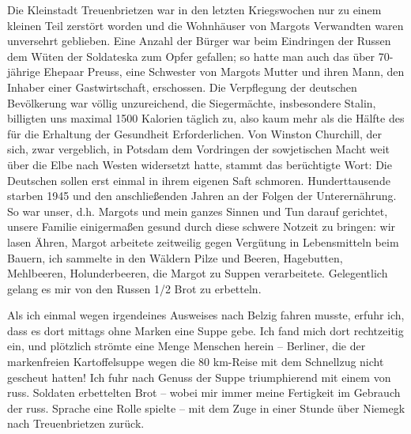  Die Kleinstadt Treuenbrietzen war in den letzten Kriegswochen nur zu einem kleinen Teil zerstört worden und die Wohnhäuser von Margots Verwandten waren unversehrt geblieben. Eine Anzahl der Bürger war beim Eindringen der Russen dem Wüten der Soldateska zum Opfer gefallen; so hatte man auch das über 70-jährige Ehepaar Preuss, eine Schwester von Margots Mutter und ihren Mann, den Inhaber einer Gastwirtschaft, erschossen. Die Verpflegung der deutschen Bevölkerung war völlig unzureichend, die Siegermächte, insbesondere Stalin, billigten uns maximal 1500 Kalorien täglich zu, also kaum mehr als die Hälfte des für die Erhaltung der Gesundheit Erforderlichen. Von Winston Churchill, der sich, zwar vergeblich, in Potsdam dem Vordringen der sowjetischen Macht weit über die Elbe nach Westen widersetzt hatte, stammt das berüchtigte Wort: Die Deutschen sollen erst einmal in ihrem eigenen Saft schmoren. Hunderttausende starben 1945 und den anschließenden Jahren an der Folgen der Unterernährung. So war unser, d.h. Margots und mein ganzes Sinnen und Tun darauf gerichtet, unsere Familie einigermaßen gesund durch diese schwere Notzeit zu bringen: wir lasen Ähren, Margot arbeitete zeitweilig gegen Vergütung in Lebensmitteln beim Bauern, ich sammelte in den Wäldern Pilze und Beeren, Hagebutten, Mehlbeeren, Holunderbeeren, die Margot zu Suppen verarbeitete. Gelegentlich gelang es  mir von den Russen 1/2 Brot zu erbetteln.

Als ich einmal wegen irgendeines Ausweises nach Belzig fahren musste, erfuhr ich, dass es dort mittags ohne Marken eine Suppe gebe. Ich fand mich dort rechtzeitig ein, und plötzlich strömte eine Menge Menschen herein -- Berliner, die der markenfreien Kartoffelsuppe wegen die 80 km-Reise mit dem Schnellzug nicht gescheut hatten! Ich fuhr nach Genuss der Suppe triumphierend mit einem von russ. Soldaten erbettelten Brot -- wobei mir immer meine Fertigkeit im Gebrauch der russ. Sprache eine Rolle spielte -- mit dem Zuge in einer Stunde über Niemegk nach Treuenbrietzen zurück.

